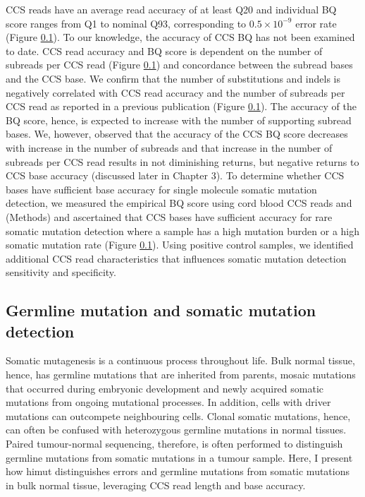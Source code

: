 CCS reads have an average read accuracy of at least Q20 and individual BQ score ranges from Q1 to nominal Q93, corresponding to $0.5\times10^{-9}$ error rate (Figure \ref{}). To our knowledge, the accuracy of CCS BQ has not been examined to date. CCS read accuracy and BQ score is dependent on the number of subreads per CCS read (Figure \ref{}) and concordance between the subread bases and the CCS base. We confirm that the number of substitutions and indels is negatively correlated with CCS read accuracy and the number of subreads per CCS read as reported in a previous publication (Figure \ref{}). The accuracy of the BQ score, hence, is expected to increase with the number of supporting subread bases. We, however, observed that the accuracy of the CCS BQ score decreases with increase in the number of subreads and that increase in the number of subreads per CCS read results in not diminishing returns, but negative returns to CCS base accuracy (discussed later in Chapter 3). To determine whether CCS bases have sufficient base accuracy for single molecule somatic mutation detection, we measured the empirical BQ score using cord blood CCS reads and (Methods) and ascertained that CCS bases have sufficient accuracy for rare somatic mutation detection where a sample has a high mutation burden or a high somatic mutation rate (Figure \ref{}). Using positive control samples, we identified additional CCS read characteristics that influences somatic mutation detection sensitivity and specificity. 

\subsection{Germline mutation and somatic mutation detection}

Somatic mutagenesis is a continuous process throughout life. Bulk normal tissue, hence, has germline mutations that are inherited from parents, mosaic mutations that occurred during embryonic development and newly acquired somatic mutations from ongoing mutational processes. In addition, cells with driver mutations can outcompete neighbouring cells. Clonal somatic mutations, hence, can often be confused with heterozygous germline mutations in normal tissues.  Paired tumour-normal sequencing, therefore, is often performed to distinguish germline mutations from somatic mutations in a tumour sample. Here, I present how himut distinguishes errors and germline mutations from somatic mutations in bulk normal tissue, leveraging CCS read length and base accuracy. 

